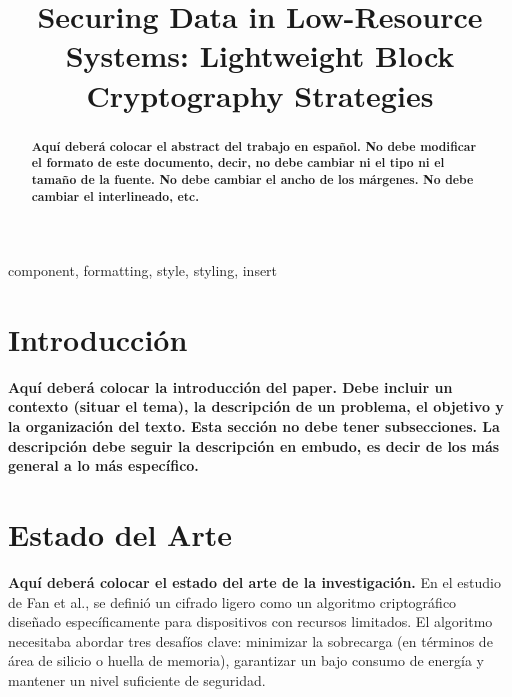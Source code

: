 \documentclass[conference]{IEEEtran}
\begin{document}
\title{Securing Data in Low-Resource Systems: Lightweight Block Cryptography Strategies}


\author{
\and
{}
}


\maketitle

\begin{abstract}

\textbf{Aquí deberá colocar el abstract del trabajo en español.
No debe modificar el formato de este documento, decir, no debe cambiar ni el tipo ni el tamaño de la fuente. No debe cambiar el ancho de los márgenes. No debe cambiar el interlineado, etc.}

\end{abstract}

\begin{IEEEkeywords}
component, formatting, style, styling, insert
\end{IEEEkeywords}

\section{Introducción}
\textbf{Aquí deberá colocar la introducción del paper. Debe incluir un contexto (situar el tema), la descripción de un problema, el objetivo y la organización del texto. Esta sección no debe tener subsecciones. La descripción debe seguir la descripción en embudo, es decir de los más general a lo más específico.}

\section{Estado del Arte}
\textbf{Aquí deberá colocar el estado del arte de la investigación.}
En el estudio de Fan et al.\cite{fan2013wg}, se definió un cifrado ligero como un algoritmo criptográfico diseñado específicamente para dispositivos con recursos limitados. El algoritmo necesitaba abordar tres desafíos clave: minimizar la sobrecarga (en términos de área de silicio o huella de memoria), garantizar un bajo consumo de energía y mantener un nivel suficiente de seguridad.
\end{document}
